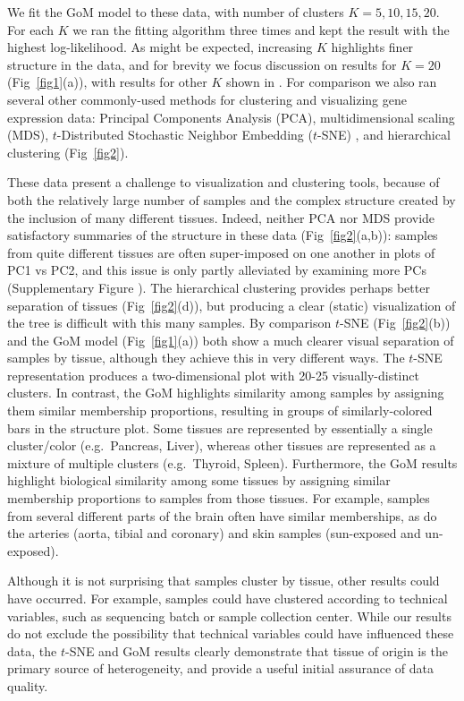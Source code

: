 \documentclass[10pt,letterpaper]{article}
\begin{document}
We fit the GoM model to these data, with number of clusters $K=5,10,15,20$. For each $K$ we ran the fitting algorithm three times and
kept the result with the highest log-likelihood. As might be expected, increasing $K$ highlights finer structure in the data, and for brevity we focus discussion
on results for $K=20$ (Fig~\ref{fig1}(a)), with results for other $K$ shown in .
For comparison we also ran several other commonly-used methods for clustering and visualizing gene expression data:
Principal Components Analysis (PCA), multidimensional scaling (MDS), $t$-Distributed Stochastic Neighbor Embedding
($t$-SNE) \cite{Maaten2008, Maaten2014}, and
hierarchical clustering (Fig~\ref{fig2}).

These data present a challenge to visualization and clustering tools, because of both the relatively large number of samples and
the complex structure created by the inclusion of many different tissues. Indeed, neither PCA nor MDS provide satisfactory summaries of the structure in these data (Fig~\ref{fig2}(a,b)): samples from quite different tissues are often super-imposed on one another in plots of PC1 vs PC2, and this issue is only partly alleviated by examining more PCs (Supplementary Figure ). The hierarchical clustering provides perhaps better separation of tissues (Fig~\ref{fig2}(d)), but producing a clear (static) visualization of the tree is difficult with this many samples. By comparison $t$-SNE (Fig~\ref{fig2}(b)) and the GoM model (Fig~\ref{fig1}(a)) both show a much clearer visual separation of samples by tissue, although they achieve this in very different ways.
The $t$-SNE representation produces a two-dimensional plot with 20-25 visually-distinct clusters. In contrast, the GoM
highlights similarity among samples by assigning them similar membership proportions, resulting in groups of similarly-colored bars in the structure plot.
Some tissues are represented by essentially a single cluster/color (e.g.~Pancreas, Liver),
whereas other tissues are represented as a mixture of multiple clusters (e.g.~Thyroid, Spleen).
Furthermore, the GoM results highlight biological similarity among some tissues by assigning similar membership proportions to samples from those tissues.  For example, samples from several different parts of the brain often have similar memberships, as do the arteries (aorta, tibial and coronary) and skin samples (sun-exposed and un-exposed).

Although it is not surprising that samples cluster by tissue, other results could have occurred. For example,
samples could have clustered according to technical variables, such as sequencing batch  \cite{yoav} or sample collection center.
While our results do not exclude the possibility that technical variables could have influenced these data, the $t$-SNE and GoM results clearly demonstrate that tissue of origin is the primary source of heterogeneity,
and provide a useful initial assurance of data quality.
\end{document}
